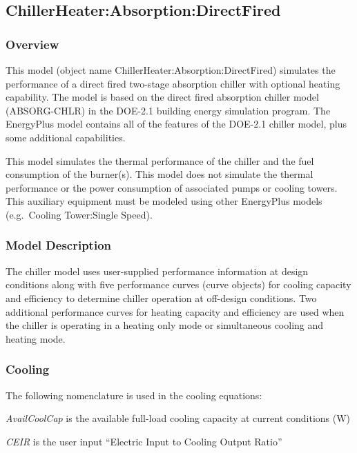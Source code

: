 \subsection{ChillerHeater:Absorption:DirectFired}\label{chillerheaterabsorptiondirectfired}

\subsubsection{Overview}\label{overview-009}

This model (object name ChillerHeater:Absorption:DirectFired) simulates the performance of a direct fired two-stage absorption chiller with optional heating capability. The model is based on the direct fired absorption chiller model (ABSORG-CHLR) in the DOE-2.1 building energy simulation program. The EnergyPlus model contains all of the features of the DOE-2.1 chiller model, plus some additional capabilities.

This model simulates the thermal performance of the chiller and the fuel consumption of the burner(s). This model does not simulate the thermal performance or the power consumption of associated pumps or cooling towers. This auxiliary equipment must be modeled using other EnergyPlus models (e.g.~Cooling Tower:Single Speed).

\subsubsection{Model Description}\label{model-description-006}

The chiller model uses user-supplied performance information at design conditions along with five performance curves (curve objects) for cooling capacity and efficiency to determine chiller operation at off-design conditions. Two additional performance curves for heating capacity and efficiency are used when the chiller is operating in a heating only mode or simultaneous cooling and heating mode.

\subsubsection{Cooling}\label{cooling}

The following nomenclature is used in the cooling equations:

\emph{AvailCoolCap} is the available full-load cooling capacity at current conditions (W)

\emph{CEIR} is the user input ``Electric Input to Cooling Output Ratio''

